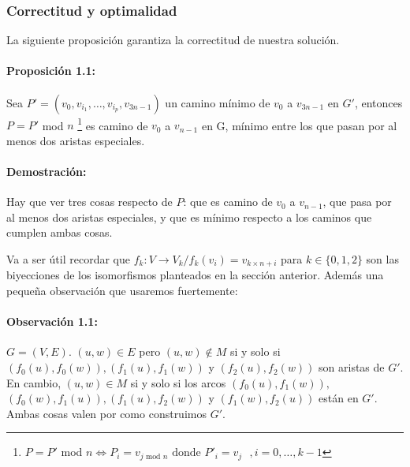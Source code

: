 \subsubsection{Correctitud y optimalidad}
La siguiente proposición garantiza la correctitud de nuestra solución.

\paragraph*{Proposición 1.1: }
Sea $P'=(v_0, v_{i_1},\dots, v_{i_p}, v_{3n-1})$ un camino mínimo de $v_0$ a $v_{3n-1}$ en $G'$, entonces $P = P'$ mod $n$ \footnote{$P = P'$ mod $n \Leftrightarrow P_i = v_{j\text{ mod }n}\text{ donde $P'_i=v_j$ }, i = 0,\dots, k-1$} es camino de $v_0$ a $v_{n-1}$ en G, mínimo entre los que pasan por al menos dos aristas especiales.

\paragraph*{Demostración: }

Hay que ver tres cosas respecto de $P$: que es camino de $v_0$ a $v_{n-1}$, que pasa por al menos dos aristas especiales, y que es mínimo respecto a los caminos que cumplen ambas cosas.

Va a ser útil recordar que $f_k:V\rightarrow V_k/ f_k(v_i) = v_{k\times n + i}$ para $k\in \{0,1,2\}$ son las biyecciones de los isomorfismos planteados en la sección anterior. Además una pequeña observación que usaremos fuertemente: 

\paragraph*{Observación 1.1: }$G=(V,E)$. $(u,w)\in E$ pero $(u,w)\notin M$ si y solo si $(f_0(u), f_0(w)), (f_1(u), f_1(w))$ y $(f_2(u), f_2(w))$ son aristas de $G'$. \\
En cambio, $(u,w)\in M$ si y solo si los arcos $(f_0(u), f_1(w)),$ $(f_0(w), f_1(u)), (f_1(u), f_2(w))$ y $(f_1(w), f_2(u))$ están en $G'$. \\
Ambas cosas valen por como construimos $G'$.

